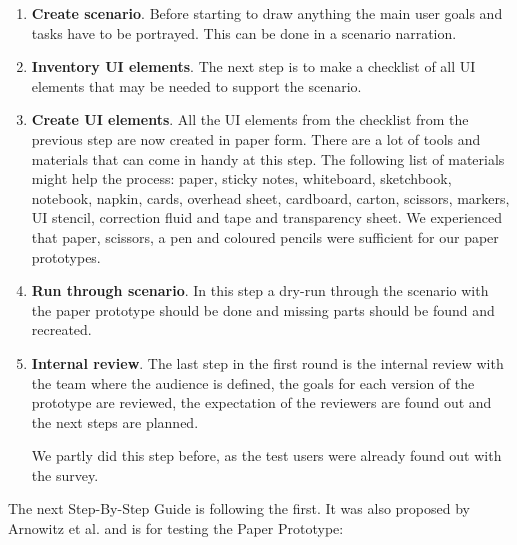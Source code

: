 \begin{enumerate}
	\item \textbf{Create scenario}. Before starting to draw anything the main user goals and tasks have to be portrayed. This can be done in a scenario narration.
	
	\item \textbf{Inventory UI elements}. The next step is to make a checklist of all UI elements that may be needed to support the scenario.
	\item \textbf{Create UI elements}. All the UI elements from the checklist from the previous step are now created in paper form. There are a lot of tools and materials that can come in handy at this step. The following list of materials might help the process: paper, sticky notes, whiteboard, sketchbook, notebook, napkin, cards, overhead sheet, cardboard, carton, scissors, markers, UI stencil, correction fluid and tape and transparency sheet. We experienced that paper, scissors, a pen and coloured pencils were sufficient for our paper prototypes.
	
	\item \textbf{Run through scenario}. In this step a dry-run through the scenario with the paper prototype should be done and missing parts should be found and recreated.
	
	\item \textbf{Internal review}. The last step in the first round is the internal review with the team where the audience is defined, the goals for each version of the prototype are reviewed, the expectation of the reviewers are found out and the next steps are planned.
	
	We partly did this step before, as the test users were already found out with the survey.
\end{enumerate}

The next Step-By-Step Guide is following the first. It was also proposed by Arnowitz et al. \cite{arnowitz2010effective} and is for testing the Paper Prototype:

